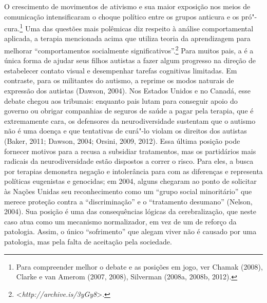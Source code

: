 O crescimento de movimentos de ativismo e sua maior exposição nos meios
de comunicação intensificaram o choque político entre os grupos anticura e
os pró"-cura.\footnote[13]{Para compreender melhor o debate e as posições em jogo, ver Chamak
(2008), Clarke e van Amerom (2007, 2008), Silverman (2008a, 2008b,
2012).} Uma das questões mais polêmicas diz
respeito à análise comportamental aplicada, a terapia mencionada acima
que utiliza teoria da aprendizagem para melhorar ``comportamentos
socialmente significativos''.\footnote[14]{\textless{}\emph{http://archive.is/3yGy8}\textgreater{}.} Para muitos pais, a 
é a única forma de ajudar seus filhos autistas a fazer algum progresso na
direção de estabelecer contato visual e desempenhar tarefas cognitivas
limitadas. Em contraste, para os militantes do autismo, a  reprime os
modos naturais de expressão dos autistas (Dawson, 2004). Nos Estados
Unidos e no Canadá, esse debate chegou aos tribunais: enquanto pais lutam
para conseguir apoio do governo ou obrigar companhias de seguros de
saúde a pagar pela terapia, que é extremamente cara, os defensores da
neurodiversidade sustentam que o autismo não é uma doença e que
tentativas de curá"-lo violam os direitos dos autistas (Baker, 2011;
Dawson, 2004; Orsini, 2009, 2012). Essa última posição pode fornecer
motivos para a recusa a subsidiar tratamentos, mas os partidários mais
radicais da neurodiversidade estão dispostos a correr o risco. Para eles,
a busca por terapias demonstra negação e intolerância para com as
diferenças e representa políticas eugenistas e genocidas; em 2004, alguns
chegaram ao ponto de solicitar às Nações Unidas seu reconhecimento como
um ``grupo social minoritário'' que merece proteção contra a
``discriminação'' e o ``tratamento desumano'' (Nelson, 2004). Sua
posição é uma das consequências lógicas da cerebralização, que neste
caso atua como um mecanismo normalizador, em vez de um de reforço da
patologia. Assim, o único ``sofrimento'' que alegam viver não é causado
por uma patologia, mas pela falta de aceitação pela sociedade.

